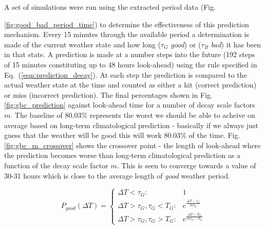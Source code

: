 {A set of simulations were run using the extracted period data (Fig. {\ref{fig:good_bad_period_time}) to determine the effectiveness of this prediction mechanism. Every 15 minutes through the available period a determination is made of the current weather state and how long ($\tau_G$ \emph{good}) or ($\tau_B$ \emph{bad}) it has been in that state. A prediction is made at a number steps into the future (192 steps of 15 minutes constituting up to 48 hours look-ahead) using the rule specified in Eq.~(\ref{eqn:prediction_decay}). At each step the prediction is compared to the actual weather state at the time and counted as either a hit (correct prediction) or miss (incorrect prediction). The final percentages shown in Fig. \ref{fig:gbc_prediction} against look-ahead time for a number of decay scale factors $m$. The baseline of 80.03\% represents the worst we should be able to acheive on average based on long-term climatological prediction - basically if we always just guess that the weather will be good this will work 80.03\% of the time. Fig. \ref{fig:gbc_m_crossover} shows the crossover point - the length of look-ahead where the prediction becomes worse than long-term climatological prediction as a function of the decay scale factor $m$. This is seen to converge towards a value of 30-31 hours which is close to the average length of \emph{good} weather period.

\begin{equation}
\label{eqn:prediction_decay}
P_{good}(\Delta T) = 
\begin{cases} 
\Delta T < \tau_G : & 1   \\ 
\Delta T > \tau_G, \tau_G < T_G : & e^{\frac{\Delta T-\tau_G}{m \tau_G}} \\
\Delta T > \tau_G , \tau_G > T_G : & e^{\frac{\Delta T-T_G}{m \tau_G-T_G}}
\end{cases}
\end{equation}



}}
